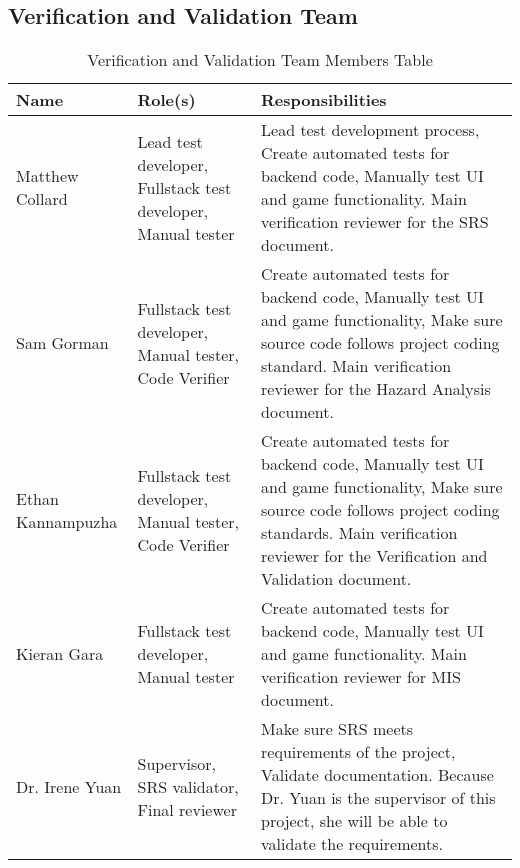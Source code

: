 \documentclass[12pt, titlepage]{article}
\begin{document}
\subsection{Verification and Validation Team}


\begin{table}[H]
\caption{Verification and Validation Team Members Table}
\centering
\begin{tabular}{|l|p{1.8in}|p{2.5in}|}
\hline
\textbf{Name}            & \textbf{Role(s)}                                       & \textbf{Responsibilities}                                                                                                                                             \\ \hline
Matthew Collard          & Lead test developer, Fullstack test developer, Manual tester               & Lead test development process, Create automated tests for backend code, Manually test UI and game functionality. Main verification reviewer for the SRS document. \\ \hline
Sam Gorman             & Fullstack test developer, Manual tester, Code Verifier       & Create automated tests for backend code, Manually test UI and game functionality, Make sure source code follows project coding standard. Main verification reviewer for the Hazard Analysis document.                                                            \\ \hline
Ethan Kannampuzha         & Fullstack test developer, Manual tester, Code Verifier                & Create automated tests for backend code, Manually test UI and game functionality, Make sure source code follows project coding standards. Main verification reviewer for the Verification and Validation document.                                                                                               \\ \hline
Kieran Gara            & Fullstack test developer, Manual tester        & Create automated tests for backend code, Manually test UI and game functionality. Main verification reviewer for MIS document.                                            \\ \hline
Dr. Irene Yuan & Supervisor, SRS validator, Final reviewer &  Make sure SRS meets requirements of the project, Validate documentation. Because Dr. Yuan is the supervisor of this project, she will be able to validate the requirements.\\ \hline
\end{tabular}
\end{table}
\end{document}
